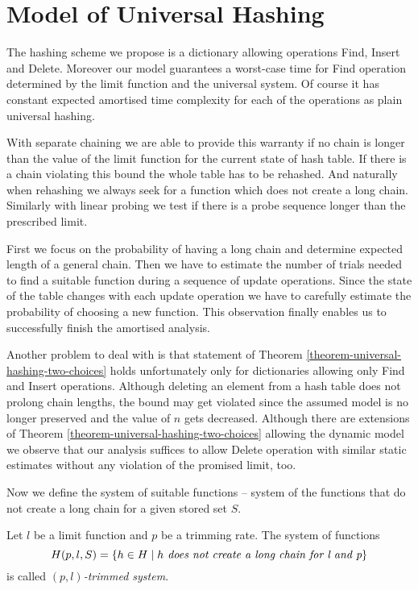 \section{Model of Universal Hashing}
\label{section-model}
The hashing scheme we propose is a dictionary allowing operations Find, Insert and Delete. Moreover our model guarantees a worst-case time for Find operation determined by the limit function and the universal system. Of course it has constant expected amortised time complexity for each of the operations as plain universal hashing. 

With separate chaining we are able to provide this warranty if no chain is longer than the value of the limit function for the current state of hash table. If there is a chain violating this bound the whole table has to be rehashed. And naturally when rehashing we always seek for a function which does not create a long chain. Similarly with linear probing we test if there is a probe sequence longer than the prescribed limit.

First we focus on the probability of having a long chain and determine expected length of a general chain. Then we have to estimate the number of trials needed to find a suitable function during a sequence of update operations. Since the state of the table changes with each update operation we have to carefully estimate the probability of choosing a new function. This observation finally enables us to successfully finish the amortised analysis.

Another problem to deal with is that statement of Theorem \ref{theorem-universal-hashing-two-choices} holds unfortunately only for dictionaries allowing only Find and Insert operations. Although deleting an element from a hash table does not prolong chain lengths, the bound may get violated since the assumed model is no longer preserved and the value of $n$ gets decreased. Although there are extensions of Theorem \ref{theorem-universal-hashing-two-choices} allowing the dynamic model \cite{DBLP:journals/jacm/Vocking03} we observe that our analysis suffices to allow Delete operation with similar static estimates without any violation of the promised limit, too. 

Now we define the system of suitable functions -- system of the functions that do not create a long chain for a given stored set $S$.
\begin{definition}
Let $l$ be a limit function and $p$ be a trimming rate. The system of functions \[ H(p, l, S) = \{ h \in H \mid h \textit{ does not create a long chain for l and p} \} \] is called \emph{$(p, l)$-trimmed system}.
\end{definition}

